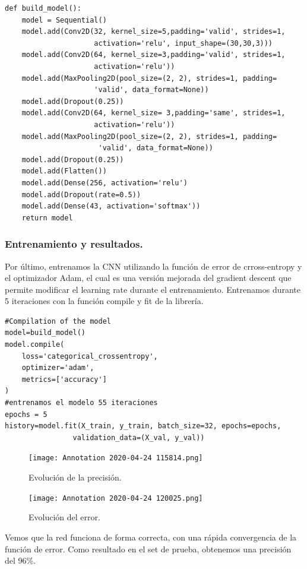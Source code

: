 \documentclass[a4paper,11pt]{article}
\begin{document}
\begin{lstlisting}
def build_model():
    model = Sequential()
    model.add(Conv2D(32, kernel_size=5,padding='valid', strides=1, 
                     activation='relu', input_shape=(30,30,3)))
    model.add(Conv2D(64, kernel_size=3,padding='valid', strides=1,
                     activation='relu'))
    model.add(MaxPooling2D(pool_size=(2, 2), strides=1, padding=
                     'valid', data_format=None))
    model.add(Dropout(0.25))
    model.add(Conv2D(64, kernel_size= 3,padding='same', strides=1, 
                     activation='relu'))
    model.add(MaxPooling2D(pool_size=(2, 2), strides=1, padding=
                      'valid', data_format=None))
    model.add(Dropout(0.25))
    model.add(Flatten())
    model.add(Dense(256, activation='relu')
    model.add(Dropout(rate=0.5))
    model.add(Dense(43, activation='softmax'))
    return model
\end{lstlisting}

\subsubsection{Entrenamiento y resultados.}
Por último, entrenamos la CNN utilizando  la función de error de crross-entropy y el optimizador Adam, el cual es una versión mejorada del gradient descent que permite modificar el learning rate durante el entrenamiento. Entrenamos durante 5 iteraciones con la función compile y fit de la librería.
\begin{lstlisting}
#Compilation of the model
model=build_model()
model.compile(
    loss='categorical_crossentropy', 
    optimizer='adam', 
    metrics=['accuracy']
)
#entrenamos el modelo 55 iteraciones
epochs = 5
history=model.fit(X_train, y_train, batch_size=32, epochs=epochs,
				validation_data=(X_val, y_val))
\end{lstlisting}

\begin{figure}[H]
\begin{minipage}[b]{0.5\linewidth}
\centering
\texttt{[image: Annotation 2020-04-24 115814.png]}
\caption{Evolución de la precisión.}
\label{fig:figura1}
\end{minipage}
\hspace{0.5cm}
\begin{minipage}[b]{0.5\linewidth}
\centering
\texttt{[image: Annotation 2020-04-24 120025.png]}
\caption{Evolución del error.}
\label{fig:figura2}
\end{minipage}
\end{figure}
\noindent
Vemos que la red funciona de forma correcta, con una rápida convergencia de la función de error. Como resultado en el set de prueba, obtenemos una precisión del 96\%.
\end{document}
